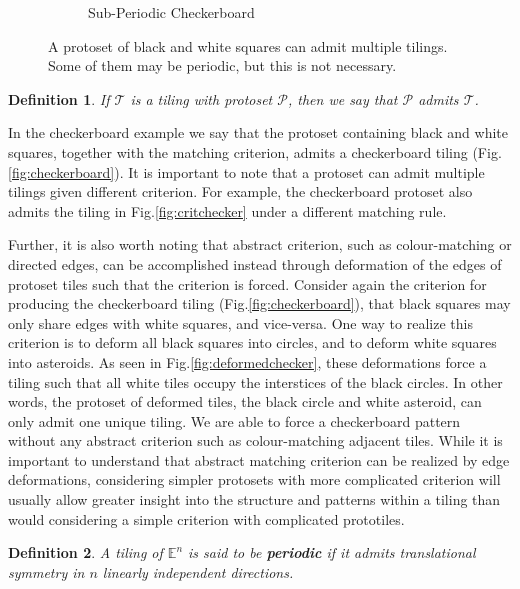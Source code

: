 \documentclass[
  oneside,
  11pt, a4paper,
  footinclude=true,
  headinclude=true,
  cleardoublepage=empty
]{scrbook}
\newtheorem{mydef}{Definition}
\begin{document}
\begin{figure}[H]
\begin{subfigure}[t]{0.4\textwidth}
    \caption{Sub-Periodic Checkerboard}
    \label{fig:aperiodicchecker}
\end{subfigure} 
\hspace*{\fill}
\label{fig:checker}
\caption{A protoset of black and white squares can admit multiple tilings. Some of them may be periodic, but this is not necessary.}
\end{figure}

\begin{mydef}
If $\mathcal{T}$ is a tiling with protoset $\mathcal{P}$, then we say that $\mathcal{P}$ admits $\mathcal{T}$.
\end{mydef}

In the checkerboard example we say that the protoset containing black and white squares, together with the matching criterion, admits a checkerboard tiling (Fig.\ref{fig:checkerboard}). It is important to note that a protoset can admit multiple tilings given different criterion. For example, the checkerboard protoset also admits the tiling in Fig.\ref{fig:critchecker} under a different matching rule. 

Further, it is also worth noting that abstract criterion, such as colour-matching or directed edges, can be accomplished instead through deformation of the edges of protoset tiles such that the criterion is forced. Consider again the criterion for producing the checkerboard tiling (Fig.\ref{fig:checkerboard}), that black squares may only share edges with white squares, and vice-versa. One way to realize this criterion is to deform all black squares into circles, and to deform white squares into asteroids. As seen in Fig.\ref{fig:deformedchecker}, these deformations force a tiling such that all white tiles occupy the interstices of the black circles. In other words, the protoset of deformed tiles, the black circle and white asteroid, can only admit one unique tiling. We are able to force a checkerboard pattern without any abstract criterion such as colour-matching adjacent tiles. While it is important to understand that abstract matching criterion can be realized by edge deformations, considering simpler protosets with more complicated criterion will usually allow greater insight into the structure and patterns within a tiling than would considering a simple criterion with complicated prototiles. 

\begin{mydef}
A tiling of  $\mathbb{E}^n$ is said to be \textbf{periodic} if it admits translational symmetry in $n$ linearly independent directions.
\end{mydef}
\end{document}
